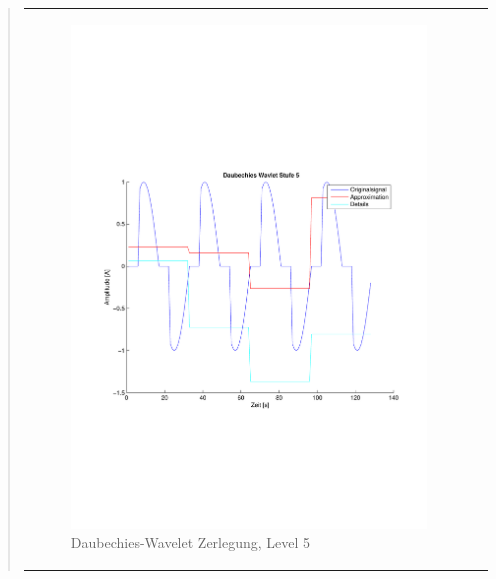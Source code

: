 \begin{quote}
\begin{center}
\begin{tabular}{ll}
\begin{minipage}{0.6\textwidth}
                    \end{minipage}
                    \begin{minipage}{0.6\textwidth}
    
                        \begin{figure}[H]
                            \label{fig:}
                            \includegraphics[scale=0.4, trim = 2cm 6cm 1cm
                            7.5cm,
                            clip]{./Bilder/Termin8/Daubechies_Wavlet_lvl_5}
                            \caption{Daubechies-Wavelet Zerlegung, Level 5}
                        \end{figure}
                    \vspace{-1.5em}
    
                    \end{minipage}
    

\end{tabular}
\end{center}
\end{quote}
